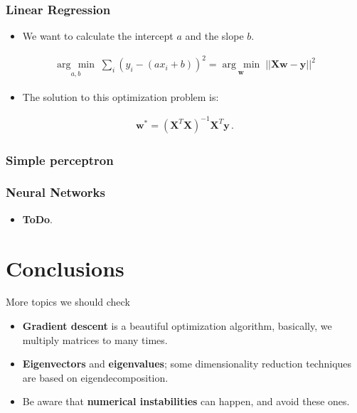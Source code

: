 \documentclass[handout]{beamer}
\newcommand{\argmin}[1]{\underset{#1}{\operatorname{arg}\,\operatorname{min}}\;}
\begin{document}
\begin{frame}[fragile]
    \frametitle{Linear Regression}
    \Large
    \begin{itemize}
        \item We want to calculate the intercept $a$ and the slope $b$.
    \end{itemize}
    \begin{align*}
        \argmin{a, b} \sum_i (y_i - (ax_i + b))^2 =
        \argmin{\boldsymbol{w}} || \boldsymbol{Xw} - \boldsymbol{y} ||^{2}
    \end{align*}
    \begin{itemize}
        \item The solution to this optimization problem is:
    \end{itemize}
    \begin{align*}
        \boldsymbol{w^{*}} = (\boldsymbol{X}^T\boldsymbol{X})^{-1}\boldsymbol{X}^{T}\boldsymbol{y}\,.
    \end{align*}
\end{frame}


\begin{frame}[fragile]\frametitle{Simple perceptron}
  \begin{figure}[htb]
        \centering
        
        \label{fig:perceptron}
	\end{figure}
\end{frame}

\begin{frame}[fragile]\frametitle{Neural Networks}
    \begin{itemize}
        \item \textbf{ToDo}.
    \end{itemize}
\end{frame}

\section{Conclusions}

\begin{frame}{More topics we should check}
    \begin{itemize}
        \item \textbf{Gradient descent} is a beautiful optimization algorithm,
                basically, we multiply matrices to many times.
        \item \textbf{Eigenvectors} and \textbf{eigenvalues}; some
                dimensionality reduction techniques are based on eigendecomposition.
        \item Be aware that \textbf{numerical instabilities} can happen, and avoid these ones.
    \end{itemize} 
\end{frame}
\end{document}
